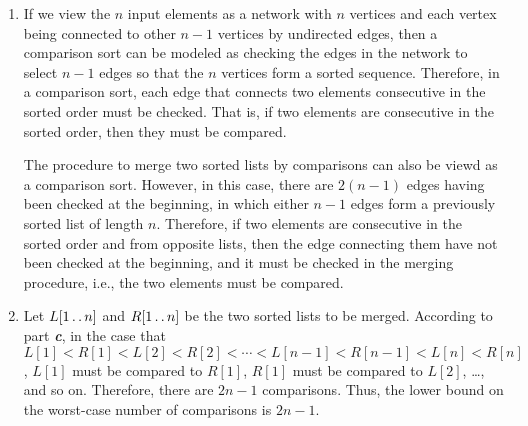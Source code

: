 \documentclass[a4paper, fleqn]{article}
\begin{document}
\begin{enumerate}
\item  %

If we view the $n$ input elements as a network with $n$ vertices and each vertex 
being connected to other $n - 1$ vertices by undirected edges, then a comparison 
sort can be modeled as checking the edges in the network to select $n - 1$ edges 
so that the $n$ vertices form a sorted sequence. Therefore, in a comparison sort, 
each edge that connects two elements consecutive in the sorted order must be 
checked. That is, if two elements are consecutive in the sorted order, then they 
must be compared.

The procedure to merge two sorted lists by comparisons can also be viewd as a 
comparison sort. However, in this case, there are $2(n - 1)$ edges having been 
checked at the beginning, in which either $n - 1$ edges form a previously sorted 
list of length $n$. Therefore, if two elements are consecutive in the sorted order 
and from opposite lists, then the edge connecting them have not been checked at 
the beginning, and it must be checked in the merging procedure, i.e., the two 
elements must be compared.



\item  %

Let $L[1 \mathinner{\ldotp\ldotp} n]$ and $R[1 \mathinner{\ldotp\ldotp} n]$ be the two sorted lists to be merged. 
According to part \textit{\textbf{c}}, in the case that $L[1] < R[1] < L[2] < R[2] 
< \cdots < L[n - 1] < R[n - 1] < L[n] < R[n]$, $L[1]$ must be compared to $R[1]$, 
$R[1]$ must be compared to $L[2]$, \ldots, and so on. Therefore, there are 
$2n - 1$ comparisons. Thus, the lower bound on the worst-case number of comparisons 
is $2n - 1$.

\end{enumerate}
\end{document}

